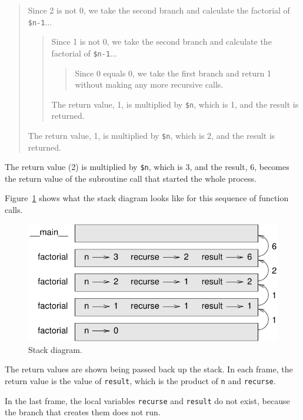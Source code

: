 \begin{quote}
Since 2 is not 0, we take the second branch and calculate the factorial of
{\tt \$n-1}...


  \begin{quote}
  Since 1 is not 0, we take the second branch and calculate the factorial
  of {\tt \$n-1}...


    \begin{quote}
    Since 0 equals 0, we take the first branch and return 1
    without making any more recursive calls.
    \end{quote}


  The return value, 1, is multiplied by \verb'$n', which is 1, and the
  result is returned.
  \end{quote}


The return value, 1, is multiplied by \verb'$n', which is 2, and the
result is returned.
\end{quote}


The return value (2) is multiplied by \verb'$n', which is 3, and the result, 6,
becomes the return value of the subroutine call that started the whole
process.

Figure~\ref{fig.stack3} shows what the stack diagram looks like for
this sequence of function calls.

\begin{figure}
\centerline
{\includegraphics[scale=0.8]{figs/stack3.pdf}}
\caption{Stack diagram.}
\label{fig.stack3}
\end{figure}

The return values are shown being passed back up the stack.  In each
frame, the return value is the value of {\tt result}, which is the
product of {\tt n} and {\tt recurse}.

In the last frame, the local
variables {\tt recurse} and {\tt result} do not exist, because
the branch that creates them does not run.

